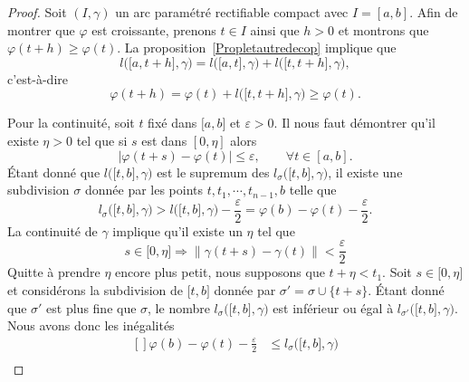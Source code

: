 \begin{proof}
	Soit \( (I,\gamma)\) un arc paramétré rectifiable compact avec \( I=[a,b]\). Afin de montrer que \( \varphi\) est croissante, prenons \( t\in I\) ainsi que \( h>0\) et montrons que \( \varphi(t+h)\geq \varphi(t)\). La proposition~\ref{Propletautredecop} implique que
	\begin{equation}
		l\big( \mathopen[ a , t+h \mathclose],\gamma \big)=l\big( \mathopen[ a ,t  \mathclose],\gamma \big)+l\big( \mathopen[ t , t+h \mathclose],\gamma \big),
	\end{equation}
	c'est-à-dire
	\begin{equation}
		\varphi(t+h)=\varphi(t)+l\big( \mathopen[ t , t+h \mathclose],\gamma \big)\geq \varphi(t).
	\end{equation}

	Pour la continuité, soit \( t\) fixé dans \( \mathopen[ a , b \mathclose]\) et \( \varepsilon>0\). Il nous faut démontrer qu'il existe \( \eta>0\) tel que si \( s\) est dans \( [0,\eta]\) alors
	\[
		|\varphi(t+s)-\varphi(t)|\leq \varepsilon, \qquad \forall t \in [a,b].
	\]
	Étant donné que \( l\big( \mathopen[ t , b \mathclose],\gamma \big)\) est le supremum des \( l_{\sigma}\big( \mathopen[ t , b \mathclose],\gamma \big)\), il existe une subdivision \( \sigma\) donnée par les points  \( t,t_1,\cdots,t_{n-1},b\) telle que
	\begin{equation}
		l_{\sigma}\big( \mathopen[ t , b \mathclose],\gamma \big)>l\big( \mathopen[ t , b \mathclose],\gamma \big)-\frac{ \varepsilon }{2}=\varphi(b)-\varphi(t)-\frac{ \varepsilon }{2}.
	\end{equation}
	La continuité de \( \gamma\) implique qu'il existe un \( \eta\) tel que
	\begin{equation}
		s\in\mathopen[ 0 , \eta \mathclose]\Rightarrow\| \gamma(t+s)-\gamma(t) \|<\frac{ \varepsilon }{2}
	\end{equation}
	Quitte à prendre \( \eta\) encore plus petit, nous supposons que \( t+\eta<t_1\). Soit \( s\in\mathopen[ 0 , \eta \mathclose]\) et considérons la subdivision de \( \mathopen[ t , b \mathclose]\) donnée par \( \sigma'=\sigma\cup\{ t+s \}\). Étant donné que \( \sigma'\) est plus fine que \( \sigma\), le nombre \( l_{\sigma}\big( \mathopen[ t , b \mathclose],\gamma \big)\) est inférieur ou égal à \( l_{\sigma'}\big( \mathopen[ t , b \mathclose],\gamma \big)\). Nous avons donc les inégalités
	\begin{equation}
		\begin{aligned}[]
			\varphi(b)-\varphi(t)-\frac{ \varepsilon }{2} & \leq l_{\sigma}\big( \mathopen[ t , b \mathclose],\gamma \big)                                                    \\

\end{aligned}
\end{equation}
\end{proof}

